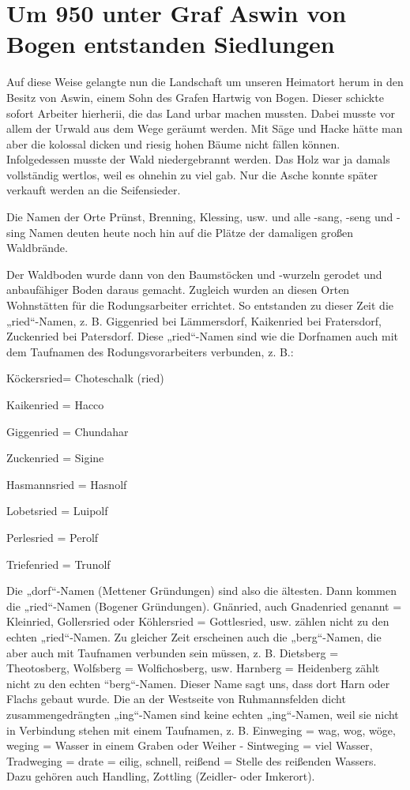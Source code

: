 \documentclass[12pt,a4pager]{book}
\begin{document}
\section{Um 950 unter Graf Aswin von Bogen entstanden Siedlungen}

Auf diese Weise gelangte nun die Landschaft um unseren Heimatort herum in den
Besitz von Aswin, einem Sohn des Grafen Hartwig von Bogen. Dieser schickte
sofort Arbeiter hierherii, die das Land urbar machen mussten. Dabei musste vor
allem der Urwald aus dem Wege geräumt werden. Mit Säge und Hacke hätte man aber
die kolossal dicken und riesig hohen Bäume nicht fällen können. Infolgedessen
musste der Wald niedergebrannt werden. Das Holz war ja damals vollständig
wertlos, weil es ohnehin zu viel gab. Nur die Asche konnte später verkauft
werden an die Seifensieder.

Die Namen der Orte Prünst, Brenning, Klessing, usw. und alle -sang, -seng und
-sing Namen deuten heute noch hin auf die Plätze der damaligen großen
Waldbrände.

Der Waldboden wurde dann von den Baumstöcken und -wurzeln gerodet und
anbaufähiger Boden daraus gemacht. Zugleich wurden an diesen Orten Wohnstätten
für die Rodungsarbeiter errichtet. So entstanden zu dieser Zeit die
„ried“-Namen, z. B. Giggenried bei Lämmersdorf, Kaikenried bei Fratersdorf,
Zuckenried bei Patersdorf. Diese „ried“-Namen sind wie die Dorfnamen auch mit
dem Taufnamen des Rodungsvorarbeiters verbunden, z. B.:

Köckersried= Choteschalk (ried)

Kaikenried = Hacco

Giggenried = Chundahar

Zuckenried = Sigine

Hasmannsried = Hasnolf

Lobetsried = Luipolf

Perlesried = Perolf

Triefenried = Trunolf

Die „dorf“-Namen (Mettener Gründungen) sind also die ältesten. Dann kommen die
„ried“-Namen (Bogener Gründungen). Gnänried, auch Gnadenried genannt =
Kleinried, Gollersried oder Köhlersried = Gottlesried, usw. zählen nicht zu den
echten „ried“-Namen. Zu gleicher Zeit erscheinen auch die „berg“-Namen, die aber
auch mit Taufnamen verbunden sein müssen, z. B. Dietsberg = Theotosberg,
Wolfsberg = Wolfichosberg, usw. Harnberg = Heidenberg zählt nicht zu den echten
“berg“-Namen. Dieser Name sagt uns, dass dort Harn oder Flachs gebaut wurde. Die
an der Westseite von Ruhmannsfelden dicht zusammengedrängten „ing“-Namen sind
keine echten „ing“-Namen, weil sie nicht in Verbindung stehen mit einem
Taufnamen, z. B. Einweging = wag, wog, wöge, weging = Wasser in einem Graben
oder Weiher - Sintweging = viel Wasser, Tradweging = drate = eilig, schnell,
reißend = Stelle des reißenden Wassers. Dazu gehören auch Handling, Zottling
(Zeidler- oder Imkerort).
\end{document}
